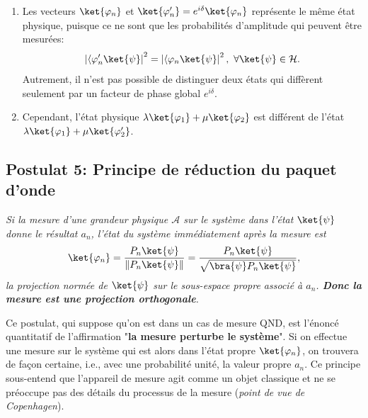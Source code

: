 \begin{remark}
\begin{enumerate}
\item Les vecteurs $\ket{\varphi_n} $ et $\ket{\varphi_n^{\prime}}
=e^{i\delta}\ket{\varphi_n}$ représente le même état physique, puisque ce ne
sont que les probabilités d'amplitude qui peuvent être mesurées:%
\begin{equation}
\left\vert \langle\varphi_n^{\prime}\ket{\psi}\right\vert
^{2}=\left\vert \langle\varphi_n\ket{\psi}\right\vert
^{2},~\forall\ket{\psi}\in\mathcal{H}.
\end{equation}
Autrement, il n'est pas possible de distinguer deux états qui diffèrent
seulement par un facteur de phase global $e^{i\delta}$.

\item Cependant, l'état physique $\lambda\ket{\varphi_1}+\mu\ket{\varphi_2}$
est différent de l'état$\lambda\ket{\varphi_1}+\mu\ket{\varphi_2^{\prime}}$.
\end{enumerate}
\end{remark}

\subsection{Postulat 5: Principe de réduction du paquet d'onde}

\colorbox[gray]{0.8}{
\parbox[c]{0.9\textwidth}{
\emph{Si la mesure d'une grandeur physique $\mathcal{A}$ sur le système dans
l'état $\ket{\psi}$ donne le résultat $a_n$, l'état du système immédiatement
après la mesure est}
\begin{equation}
\ket{\varphi_n} =\frac{P_n\ket{\psi}}{\|P_n\ket{\psi}\|}=\frac
{P_n\ket{\psi}}{\sqrt{\bra{\psi}P_n\ket{\psi}}},
\label{eq:PrReduc}
\end{equation}
\emph{la projection normée de $\ket{\psi}$ sur le sous-espace propre associé à
$a_n$. \textbf{Donc la mesure est une projection orthogonale}.}
}}
\medskip

Ce postulat, qui suppose qu'on est dans un cas de mesure QND, est l'énoncé
quantitatif de l'affirmation "\textbf{la mesure perturbe le système}". Si on
effectue une mesure sur le système qui est alors dans l'état propre
$\ket{\varphi_n} $, on trouvera de façon certaine, i.e., avec une probabilité
unité, la valeur propre $a_n$. Ce principe sous-entend que l'appareil de
mesure agit comme un objet classique et ne se préoccupe pas des détails du
processus de la mesure (\emph{point de vue de Copenhagen}).


